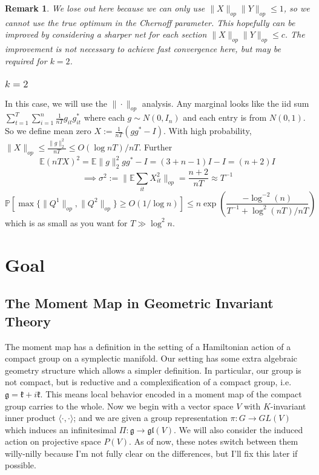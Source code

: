 \documentclass{article}
\newtheorem{remark}{Remark}
\newcommand{\E}{\mathbb{E}}
\renewcommand{\Pr}{\mathbb{P}}
\begin{document}
\begin{remark}
We lose out here because we can only use $\|X\|_{op} \|Y\|_{op} \leq 1$, so we cannot use the true optimum in the Chernoff parameter. This hopefully can be improved by considering a sharper net for each section $\|X\|_{op} \|Y\|_{op} \leq c$. The improvement is not necessary to achieve fast convergence here, but may be required for $k=2$. 
\end{remark}


\subsubsection{$k=2$}
In this case, we will use the $\|\cdot\|_{op}$ analysis. Any marginal looks like the iid sum $\sum_{t=1}^{T} \sum_{i=1}^{n} \frac{1}{nT} g_{it} g_{it}^{*}$ where each $g \sim N(0,I_{n})$ and each entry is from $N(0,1)$. So we define mean zero $X := \frac{1}{nT}(g g^{*} - I)$. With high probability, $\|X\|_{op} \leq \frac{\|g\|_{2}^{2}}{nT} \leq O(\log n T)/nT$. Further
\[ \E (n T X)^{2} = \E \|g\|_{2}^{2} g g^{*} - I = (3 + n-1)I - I = (n+2) I  \]
\[ \implies \sigma^{2} := \|\E \sum_{it} X_{it}^{2}\|_{op} = \frac{n+2}{nT} \approx T^{-1}  \]
\[ \Pr[ \max\{\|Q^{1}\|_{op}, \|Q^{2}\|_{op}\} \geq O(1/\log n) ] \leq n \exp \left( \frac{-\log^{-2}(n)}{T^{-1} + \log^{2}(n T)/nT}  \right) \]
which is as small as you want for $T \gg \log^{2} n$. 




\section{Goal}

\subsection{The Moment Map in Geometric Invariant Theory}

The moment map has a definition in the setting of a Hamiltonian action of a compact group on a symplectic manifold. Our setting has some extra algebraic geometry structure which allows a simpler definition. In particular, our group is not compact, but is reductive and a complexification of a compact group, i.e. $\mathfrak{g} = \mathfrak{k} + i \mathfrak{k}$. This means local behavior encoded in a moment map of the compact group carries to the whole. Now we begin with a vector space $V$ with $K$-invariant inner product $\langle \cdot, \cdot \rangle$; and we are given a group representation $\pi : G \to GL(V)$ which induces an infinitesimal $\Pi : \mathfrak{g} \to \mathfrak{gl}(V)$. We will also consider the induced action on projective space $P(V)$. As of now, these notes switch between them willy-nilly because I'm not fully clear on the differences, but I'll fix this later if possible. 
\end{document}
